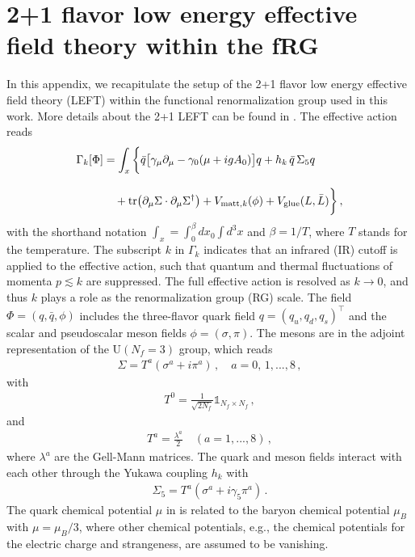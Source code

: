 \documentclass[aps,twocolumn,prd,superscriptaddress,nofootinbib,floatfix]{revtex4-2}
\begin{document}
\appendix 




\section{2+1 flavor low energy effective field theory within the fRG}
\label{app:LEFT2p1}

In this appendix, we recapitulate the setup of the 2+1 flavor low energy effective field theory (LEFT) within the functional renormalization group used in this work. More details about the 2+1 LEFT can be found in \cite{Wen:2018nkn}. The effective action reads
\begin{align}
    \Gamma_{k}[\Phi]&=\int_x \bigg\{ \bar{q} \big[\gamma_\mu \partial_\mu-\gamma_0(\mu+igA_0)\big]q+h_k\,\bar{q} \,\Sigma_5 q\nonumber\\[2ex]
    &\quad+\text{tr}\big(\partial_\mu \Sigma \cdot \partial_\mu\Sigma^\dagger \big)+V_{\mathrm{\tiny{matt}},k}(\phi)+V_{\mathrm{\tiny{glue}}}(L, \bar L)\bigg\}\,,\label{eq:action}
\end{align}
with the shorthand notation $\int_{x}=\int_0^{\beta}d x_0 \int d^3 x$ and $\beta=1/T$, where $T$ stands for the temperature. The subscript $k$ in $\Gamma_{k}$ indicates that an infrared (IR) cutoff is applied to the effective action, such that quantum and thermal fluctuations of momenta $p\lesssim k$ are suppressed. The full effective action is resolved as $k \to 0$, and thus $k$ plays a role as the renormalization group (RG) scale. The field $\Phi=(q, \bar q, \phi)$ includes the three-flavor quark field $q=(q_u, q_d, q_s)^\intercal$ and the scalar and pseudoscalar meson fields $\phi=(\sigma, \pi)$. The mesons are in the adjoint representation of the $\mathrm{U}(N_f=3)$ group, which reads
\begin{align}
    \Sigma=T^a(\sigma^a+i \pi^a)\,, \quad a=0,\,1,...,8\,,\label{}
\end{align}
with
\begin{align}
    T^{0}=\frac{1}{\sqrt{2N_{f}}}\mathbb{1}_{N_{f}\times N_{f}}\,,\label{}
\end{align}
and
\begin{align}
    T^a=\frac{\lambda^a}{2} \quad(a=1,...,8)\,, \label{}
\end{align}
where $\lambda^a$ are the Gell-Mann matrices. The quark and meson fields interact with each other through the Yukawa coupling $h_k$ with
\begin{align}
    \Sigma_5=T^a(\sigma^a+i \gamma_5\pi^a)\,.\label{}
\end{align}
The quark chemical potential $\mu$ in  is related to the baryon chemical potential $\mu_B$ with $\mu=\mu_B/3$, where other chemical potentials, e.g., the chemical potentials for the electric charge and strangeness, are assumed to be vanishing.
\end{document}
